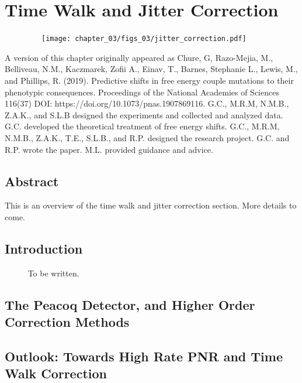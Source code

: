\documentclass[12pt]{caltech_thesis}
\begin{document}
\hypertarget{time-walk-and-jitter-correction}{%
\chapter{Time Walk and Jitter
Correction}\label{time-walk-and-jitter-correction}}

~~~~~~~~~\texttt{[image: chapter\_03/figs\_03/jitter\_correction.pdf]}

A version of this chapter originally appeared as Chure, G, Razo-Mejia,
M., Belliveau, N.M., Kaczmarek, Zofii A., Einav, T., Barnes, Stephanie
L., Lewis, M., and Phillips, R. (2019). Predictive shifts in free energy
couple mutations to their phenotypic consequences. Proceedings of the
National Academies of Sciences 116(37) DOI:
https://doi.org/10.1073/pnas.1907869116. G.C., M.R.M, N.M.B., Z.A.K.,
and S.L.B designed the experiments and collected and analyzed data. G.C.
developed the theoretical treatment of free energy shifts. G.C., M.R.M,
N.M.B., Z.A.K., T.E., S.L.B., and R.P. designed the research project.
G.C. and R.P. wrote the paper. M.L. provided guidance and advice.

\hypertarget{abstract-2}{%
\section{Abstract}\label{abstract-2}}

This is an overview of the time walk and jitter correction section. More
details to come.

\hypertarget{introduction-2}{%
\section{Introduction}\label{introduction-2}}

~~~~~ To be written.

\hypertarget{the-peacoq-detector-and-higher-order-correction-methods}{%
\section{The Peacoq Detector, and Higher Order Correction
Methods}\label{the-peacoq-detector-and-higher-order-correction-methods}}

\hypertarget{outlook-towards-high-rate-pnr-and-time-walk-correction}{%
\section{Outlook: Towards High Rate PNR and Time Walk
Correction}\label{outlook-towards-high-rate-pnr-and-time-walk-correction}}
\end{document}
